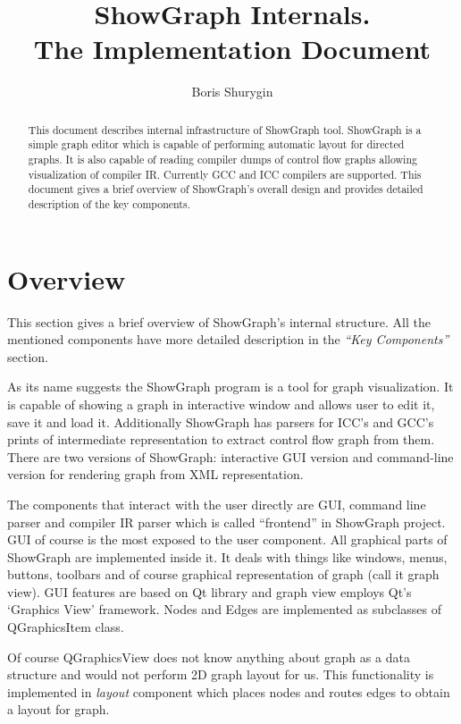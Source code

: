 \documentclass[11pt,twoside,a4paper]{article}
\begin{document}
 
\lstset{language=[Visual]C++}

\title{ShowGraph Internals.\\ \textsf{The Implementation Document}}
\author{Boris Shurygin}

\maketitle
\begin{abstract}
This document describes internal infrastructure of ShowGraph tool. ShowGraph is a simple graph editor which is capable of performing automatic layout for directed graphs. It is also capable of reading compiler dumps of control flow graphs allowing visualization of compiler IR. Currently GCC and ICC compilers are supported. This document gives a brief overview of ShowGraph's overall design and provides detailed description of the key components.
\end{abstract}
\tableofcontents
\section{Overview}
This section gives a brief overview of ShowGraph's internal structure. All the mentioned components have more detailed description in the \emph{``Key Components''} section.

As its name suggests the ShowGraph program is a tool for graph visualization. It is capable of showing a graph in interactive window and allows user to edit it, save it and load it. Additionally ShowGraph has parsers for ICC's and GCC's prints of intermediate representation to extract control flow graph from them. There are two versions of ShowGraph: interactive GUI version and command-line version for rendering graph from XML representation.

The components that interact with the user directly are GUI, command line parser and compiler IR parser which is called ``frontend'' in ShowGraph project. GUI of course is the most exposed to the user component. All graphical parts of ShowGraph are implemented inside it. It deals with things like windows, menus, buttons, toolbars and of course graphical representation of graph (call it graph view). GUI features are based on Qt library and graph view employs Qt's `Graphics View' framework. Nodes and Edges are implemented as subclasses of QGraphicsItem class.

Of course QGraphicsView does not know anything about graph as a data structure and would not perform 2D graph layout for us. This functionality is implemented in \emph{layout} component which places nodes and routes edges to obtain a layout for graph.
\end{document}
